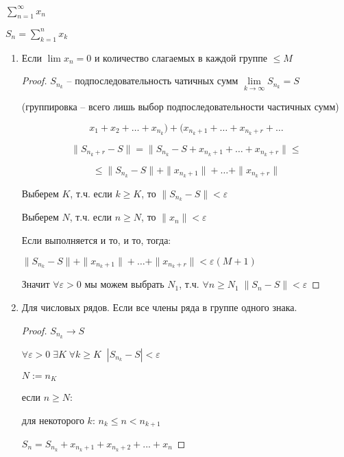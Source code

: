 \begin{theorem} \thmslashn

	$\sum\limits_{n=1}^{\infty}x_n$

	$S_n = \sum\limits_{k=1}^{n}x_k$

	\begin{enumerate}

		\item Если $\lim x_n = 0$ и количество слагаемых в каждой группе $\le M$
		
			\begin{proof} \thmslashn

				$S_{n_k}$ -- подпоследовательность чатичных сумм $\lim\limits_{k\to \infty} S_{n_k} = S$

				(группировка – всего лишь выбор подпоследовательности частичных сумм)

				\[
					x_1 + x_2 + \ldots + x_{n_k}) + (x_{n_k + 1} + \ldots + x_{n_k + r} + \ldots	
				\]

				\[
					\|S_{n_k + r} - S\| = \|S_{n_k} - S + x_{n_k + 1} + \ldots + x_{n_k + r}\| \le	
				\]

				\[
					\le \|S_{n_k} - S\| + \|x_{n_k + 1}\| + \ldots + \|x_{n_k + r}\|	
				\]

				Выберем $K$, т.ч. если $k \ge K$, то $\|S_{n_k} - S\| < \varepsilon$

				Выберем $N$, т.ч. если $n \ge N$, то $\|x_n\| <  \varepsilon$

				Если выполняется и то, и то, тогда:
				
				$\|S_{n_k} - S\| + \|x_{n_k + 1}\| + \ldots + \|x_{n_k + r}\| < \varepsilon(M + 1)$

				Значит $\forall \varepsilon > 0$ мы можем выбрать $N_1$, т.ч. $\forall n \ge N_1 \; \|S_n - S\| < \varepsilon$
			\end{proof}
		\item Для числовых рядов. Если все члены ряда в группе одного знака.

			\begin{proof} \thmslashn
				
				$S_{n_k} \to S$

				$\forall \varepsilon > 0\; \exists K \; \forall k \ge K\;\; |S_{n_k} - S| < \varepsilon$
		
				$N:= n_K$
		
				если $n \ge N$:
				
				для некоторого $k$: \;$n_k \le n < n_{k+1}$
		
				$S_n = S_{n_k} + x_{n_k+1} + x_{n_k+2} + ...+x_n$
		

\end{proof}
\end{enumerate}
\end{theorem}
